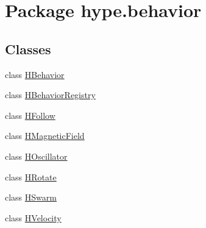 \hypertarget{namespacehype_1_1behavior}{\section{Package hype.\-behavior}
\label{namespacehype_1_1behavior}
}
\subsection*{Classes}
\begin{DoxyCompactItemize}
\item 
class \hyperlink{classhype_1_1behavior_1_1_h_behavior}{H\-Behavior}
\item 
class \hyperlink{classhype_1_1behavior_1_1_h_behavior_registry}{H\-Behavior\-Registry}
\item 
class \hyperlink{classhype_1_1behavior_1_1_h_follow}{H\-Follow}
\item 
class \hyperlink{classhype_1_1behavior_1_1_h_magnetic_field}{H\-Magnetic\-Field}
\item 
class \hyperlink{classhype_1_1behavior_1_1_h_oscillator}{H\-Oscillator}
\item 
class \hyperlink{classhype_1_1behavior_1_1_h_rotate}{H\-Rotate}
\item 
class \hyperlink{classhype_1_1behavior_1_1_h_swarm}{H\-Swarm}
\item 
class \hyperlink{classhype_1_1behavior_1_1_h_velocity}{H\-Velocity}
\end{DoxyCompactItemize}
